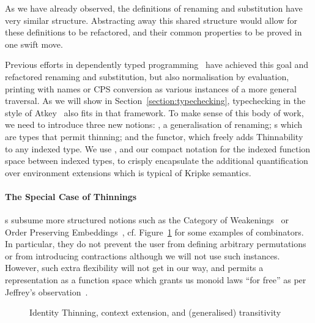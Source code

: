 As we have already observed, the definitions of renaming and substitution have very
similar structure. Abstracting away this shared structure would allow for these
definitions to be refactored, and their common properties to be proved in one swift
move.

Previous efforts in dependently typed
programming~\cite{benton2012strongly,allais2017type}
have achieved this goal and refactored renaming and substitution,
but also normalisation by evaluation, printing with names or CPS conversion
as various instances of a more general traversal. As we will show in Section~\ref{section:typechecking},
typechecking in the style of Atkey~\citeyear{atkey2015algebraic} also
fits in that framework. To make sense of this body of work, we
need to introduce three new notions: , a generalisation of
renaming; s which are types that permit thinning; and the
 functor, which freely adds Thinnability to any indexed type.
We use , and our compact notation for the indexed function space
between indexed types, to crisply encapsulate the additional quantification
over environment extensions which is typical of Kripke semantics.
\label{def:thinning}
\begin{center}
\end{center}

\paragraph{The Special Case of Thinnings} s subsume more
structured notions such as the Category of
Weakenings~\cite{altenkirch1995categorical} or Order Preserving
Embeddings~\cite{chapman2009type}, cf. Figure~\ref{fig:thincomb} for
some examples of combinators. In particular, they do not prevent the
user from defining arbitrary permutations or from introducing contractions
although we will not use such instances. However, such extra flexibility
will not get in our way, and permits a representation as a function space
which grants us monoid laws ``for free'' as per Jeffrey's
observation~\citeyear{jeffrey2011assoc}.

\begin{figure}[h]
\begin{minipage}{0.45\textwidth}
\end{minipage}
\begin{minipage}{0.45\textwidth}
\end{minipage}
\caption{Identity Thinning, context extension, and (generalised) transitivity}\label{fig:thincomb}
\end{figure}


